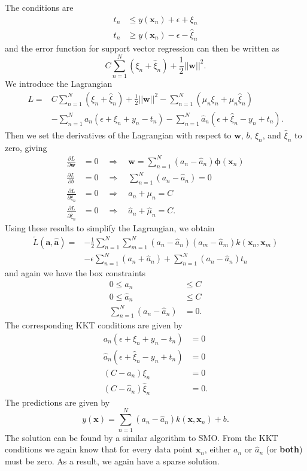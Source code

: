 \documentclass[a4paper]{report}
\renewcommand{\bf}{\mathbf}
\newcommand{\bs}{\boldsymbol}
\begin{document}
The conditions are
\begin{align}
	t_n &\leq y(\bf{x}_n) + \epsilon + \xi_n \\
	t_n &\geq y(\bf{x}_n) - \epsilon - \hat{\xi}_n
\end{align}
and the error function for support vector regression can then be written as
\begin{equation}
	C \sum_{n=1}^{N}(\xi_n + \hat{\xi}_n) + \frac{1}{2} ||\bf{w}||^2.
\end{equation}
We introduce the Lagrangian
\begin{align}
	L = & C \sum_{n=1}^N (\xi_n + \hat{\xi}_n) + \frac{1}{2} ||\bf{w}||^2 - \sum_{n=1}^N (\mu_n\xi_n + \hat{\mu}_n\hat{\xi}_n) \\
	 &- \sum_{n=1}^N a_n(\epsilon + \xi_n + y_n -t_n) - \sum_{n=1}^N \hat{a}_n(\epsilon+\hat{\xi}_n-y_n+t_n).
\end{align}
Then we set the derivatives of the Lagrangian with respect to $\bf{w}$, $b$, $\xi_n$, and $\hat{\xi}_n$ to zero, giving
\begin{align}
	\frac{\partial L}{\partial \bf{w}} &= 0 \quad \Rightarrow \quad \bf{w} = \sum_{n=1}^N (a_n-\hat{a}_n)\bs{\phi}(\bf{x}_n)\\
	\frac{\partial L}{\partial b} &=0 \quad \Rightarrow \quad \sum_{n=1}^N(a_n-\hat{a}_n) = 0 \\
	\frac{\partial L}{\partial \xi_n} &= 0 \quad \Rightarrow \quad a_n+\mu_n = C \\
	\frac{\partial L}{\partial \hat{\xi}_n} &= 0 \quad \Rightarrow \quad \hat{a}_n+\hat{\mu}_n = C.
\end{align}
Using these results to simplify the Lagrangian, we obtain
\begin{align}
	\tilde{L}(\bf{a},\hat{\bf{a}}) = &-\frac{1}{2} \sum_{n=1}^N \sum_{m=1}^N (a_n-\hat{a}_n)(a_m-\hat{a}_m)k(\bf{x}_n,\bf{x}_m) \\
	&- \epsilon \sum_{n=1}^N (a_n+\hat{a}_n) + \sum_{n=1}^N (a_n - \hat{a}_n)t_n
\end{align}
and again we have the box constraints
\begin{align}
	0 \leq a_n &\leq C \\
	0 \leq \hat{a}_n &\leq C \\
	\sum_{n=1}^N (a_n - \hat{a}_n) &= 0.
\end{align}
The corresponding KKT conditions are given by
\begin{align}
	a_n(\epsilon + \xi_n + y_n -t_n) &= 0\\
	\hat{a}_n(\epsilon + \hat{\xi}_n-y_n+t_n) &= 0\\
	(C - a_n)\xi_n &= 0\\
	(C - \hat{a}_n) \hat{\xi}_n &= 0.
\end{align}
The predictions are given by
\begin{equation}
	y(\bf{x}) = \sum_{n=1}^N (a_n - \hat{a}_n)k(\bf{x},\bf{x}_n) +b.
\end{equation}
The solution can be found by a similar algorithm to SMO. From the KKT conditions we again know that for every data point $\bf{x}_n$, either $a_n$ or $\hat{a}_n $ (or \textbf{both}) must be zero. As a result, we again have a sparse solution.
\end{document}

